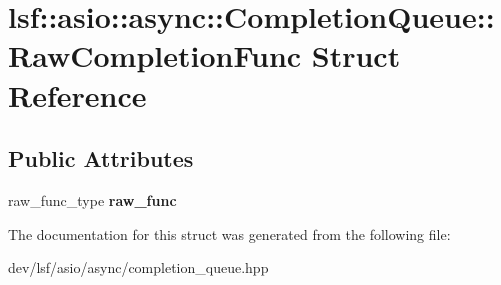 \hypertarget{structlsf_1_1asio_1_1async_1_1CompletionQueue_1_1RawCompletionFunc}{
\section{lsf::asio::async::CompletionQueue::RawCompletionFunc Struct Reference}
\label{structlsf_1_1asio_1_1async_1_1CompletionQueue_1_1RawCompletionFunc}
}
\subsection*{Public Attributes}
\begin{DoxyCompactItemize}
\item 
\hypertarget{structlsf_1_1asio_1_1async_1_1CompletionQueue_1_1RawCompletionFunc_af6d2722d0fb017dc91064f8c38907a33}{
raw\_\-func\_\-type {\bfseries raw\_\-func}}
\label{structlsf_1_1asio_1_1async_1_1CompletionQueue_1_1RawCompletionFunc_af6d2722d0fb017dc91064f8c38907a33}

\end{DoxyCompactItemize}


The documentation for this struct was generated from the following file:\begin{DoxyCompactItemize}
\item 
dev/lsf/asio/async/completion\_\-queue.hpp\end{DoxyCompactItemize}
